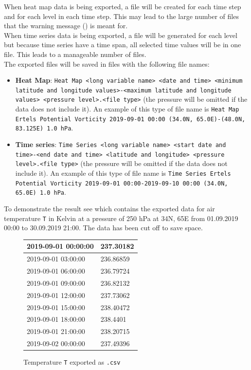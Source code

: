 \documentclass[../00_main.tex]{subfiles}
\begin{document}
When heat map data is being exported, a file will be created for each time step
and for each level in each time step. This may lead to the large number of
files that the warning message () is meant for.\\
When time series data is being exported, a file will be generated for each
level but because time series have a time span, all selected time values will
be in one file. This leads to a manageable number of files.\\
The exported files will be saved in files with the following file names:
\begin{itemize}
    \item \textbf{Heat Map}: \texttt{Heat Map <long variable name> <date and
        time> <minimum latitude and longitude values>-<maximum latitude and
        longitude values> <pressure level>.<file type>} (the pressure will be
        omitted if the data does not include it). An example of this type of
        file name is \texttt{Heat Map Ertels Potential Vorticity 2019-09-01
        00:00 (34.0N, 65.0E)-(48.0N, 83.125E) 1.0 hPa}.
    \item \textbf{Time series}: \texttt{Time Series <long variable name>
        <start date and time>-<end date and time> <latitude and longitude> 
        <pressure level>.<file type>} (the pressure will be
        omitted if the data does not include it). An example of this type of
        file name is \texttt{Time Series Ertels Potential Vorticity 2019-09-01
        00:00-2019-09-10 00:00 (34.0N, 65.0E) 1.0 hPa}.
\end{itemize}
To demonstrate the result see  which contains the exported
data for air temperature \texttt{T} in Kelvin at a pressure of 250 hPa at 
34\textdegree{}N,
65\textdegree{}E from 01.09.2019 00:00 to 30.09.2019 21:00. The data has been cut
off to save space.
\begin{figure}
\center
    \begin{tabular}{| p{5cm} | p{5cm} |} \hline
        2019-09-01 00:00:00   &  237.30182  \\\hline 
        2019-09-01 03:00:00   &  236.86859  \\\hline
        2019-09-01 06:00:00   &  236.79724  \\\hline
        2019-09-01 09:00:00   &  236.82132  \\\hline
        2019-09-01 12:00:00   &  237.73062  \\\hline
        2019-09-01 15:00:00   &  238.40472  \\\hline
        2019-09-01 18:00:00   &  238.4401   \\\hline
        2019-09-01 21:00:00   &  238.20715  \\\hline
        2019-09-02 00:00:00   &  237.49396  \\\hline
    \end{tabular}
    \caption{Temperature \texttt{T} exported as \texttt{.csv}}
    \label{tab:de01}
\end{figure}
\end{document}
